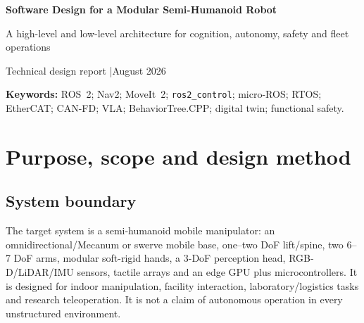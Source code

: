 \documentclass[10pt,a4paper]{article}
\begin{document}
\begin{center}
{\LARGE\bfseries Software Design for a Modular Semi-Humanoid Robot\par}
\vspace{0.4em}
{\large A high-level and low-level architecture for cognition, autonomy, safety and fleet operations\par}
\vspace{0.65em}
\small Technical design report \quad|\quad August 2026
\end{center}

\begin{abstract}
This report defines an implementation-oriented software architecture for a wheeled semi-humanoid robot with a mobile base, vertical lift, dual arms, tactile hands and an expressive perception head. It synthesizes the supplied literature reviews, market analyses and cross-project architecture into a multi-rate system that separates non-deterministic cognitive inference from deterministic motion execution and independently enforced safety. The high-level stack comprises speech and perception, Vision-Language-Action (VLA) proposals, mission orchestration, navigation, manipulation, digital-twin validation and fleet operations. The low-level stack comprises hardware abstraction, fieldbus gateways, native RTOS control tasks, impedance control, tactile/contact processing, power-aware diagnostics and fail-safe state transitions. The recommended design assigns explicit ownership to each rate domain, limits AI outputs to validated skills and constraints, and treats telemetry, container release management and simulation-to-hardware tests as first-class parts of the product.
\end{abstract}

\noindent\textbf{Keywords:} ROS~2; Nav2; MoveIt~2; \texttt{ros2\_control}; micro-ROS; RTOS; EtherCAT; CAN-FD; VLA; BehaviorTree.CPP; digital twin; functional safety.

\section{Purpose, scope and design method}
\subsection{System boundary}
The target system is a semi-humanoid mobile manipulator: an omnidirectional/Mecanum or swerve mobile base, one--two DoF lift/spine, two 6--7 DoF arms, modular soft-rigid hands, a 3-DoF perception head, RGB-D/LiDAR/IMU sensors, tactile arrays and an edge GPU plus microcontrollers. It is designed for indoor manipulation, facility interaction, laboratory/logistics tasks and research teleoperation. It is not a claim of autonomous operation in every unstructured environment.
\end{document}
